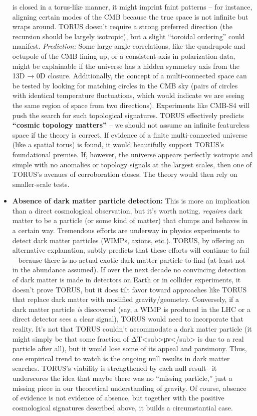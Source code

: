 \documentclass[]{article}
\begin{document}
\begin{itemize}
  is closed in a torus-like manner, it might imprint faint patterns --
  for instance, aligning certain modes of the CMB because the true space
  is not infinite but wraps around. TORUS doesn't require a strong
  preferred direction (the recursion should be largely isotropic), but a
  slight ``toroidal ordering'' could manifest. \emph{Prediction:} Some
  large-angle correlations, like the quadrupole and octupole of the CMB
  lining up, or a consistent axis in polarization data, might be
  explainable if the universe has a hidden symmetry axis from the 13D →
  0D closure​. Additionally, the concept of a multi-connected space can
  be tested by looking for matching circles in the CMB sky (pairs of
  circles with identical temperature fluctuations, which would indicate
  we are seeing the same region of space from two directions).
  Experiments like CMB-S4 will push the search for such topological
  signatures​. TORUS effectively predicts \textbf{``cosmic topology
  matters''} -- we should not assume an infinite featureless space if
  the theory is correct. If evidence of a finite multi-connected
  universe (like a spatial torus) is found, it would beautifully support
  TORUS's foundational premise. If, however, the universe appears
  perfectly isotropic and simple with no anomalies or topology signals
  at the largest scales, then one of TORUS's avenues of corroboration
  closes. The theory would then rely on smaller-scale tests.
\item
  \textbf{Absence of dark matter particle detection:} This is more an
  implication than a direct cosmological observation, but it's worth
  noting.  \emph{requires} dark matter to be a particle (or some
  kind of matter) that clumps and behaves in a certain way. Tremendous
  efforts are underway in physics experiments to detect dark matter
  particles (WIMPs, axions, etc.). TORUS, by offering an alternative
  explanation, subtly predicts that these efforts will continue to fail
  -- because there is no actual exotic dark matter particle to find (at
  least not in the abundance assumed). If over the next decade no
  convincing detection of dark matter is made in detectors on Earth or
  in collider experiments, it doesn't prove TORUS, but it does tilt
  favor toward approaches like TORUS that replace dark matter with
  modified gravity/geometry. Conversely, if a dark matter particle
  \emph{is} discovered (say, a WIMP is produced in the LHC or a direct
  detector sees a clear signal), TORUS would need to incorporate that
  reality. It's not that TORUS couldn't accommodate a dark matter
  particle (it might simply be that some fraction of
  ΔT\textless{}sub\textgreater{}μν\textless{}/sub\textgreater{} is due
  to a real particle after all), but it would lose some of its appeal
  and parsimony. Thus, one empirical trend to watch is the ongoing null
  results in dark matter searches. TORUS's viability is strengthened by
  each null result​-- it underscores the idea that maybe there was no
  ``missing particle,'' just a missing piece in our theoretical
  understanding of gravity. Of course, absence of evidence is not
  evidence of absence, but together with the positive cosmological
  signatures described above, it builds a circumstantial case.
\end{itemize}
\end{document}
